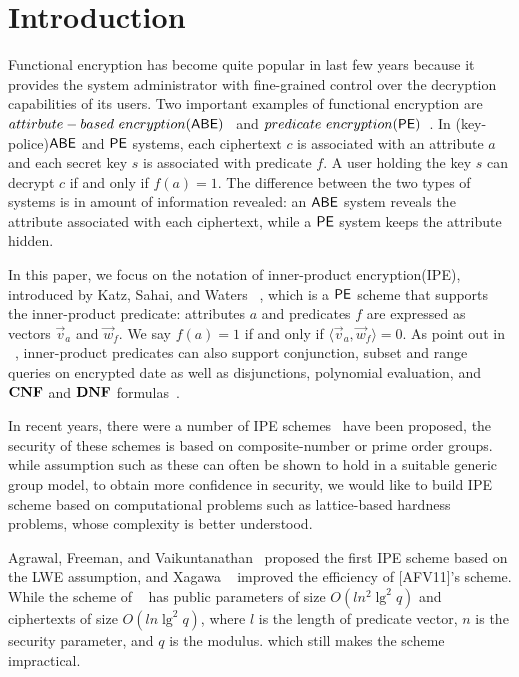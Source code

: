 \section{Introduction}
Functional encryption has become quite popular in last few years because it provides the system administrator with fine-grained control over the decryption capabilities of its users. Two important examples of functional encryption are $attirbute-based\ encryption(\ABE)$~\cite{EC:SahWat05, CCS:GPSW06} and $predicate\ encryption(\mathsf{PE})\\ $~\cite{TCC:BonWat07,
EC:KatSahWat08}. In (key-police)$\mathsf{ABE}$ and $\mathsf{PE}$ systems, each ciphertext $c$ is associated with an attribute $a$ and each secret key $s$ is associated with predicate $f$. A user holding the key $s$ can decrypt $c$ if and only if $f(a)=1$. The difference between the two types of systems is in amount of information revealed: an $\mathsf{ABE}$ system reveals the attribute associated with each ciphertext, while a $\mathsf{PE}$ system keeps the attribute hidden.\

In this paper, we focus on the notation of inner-product encryption(IPE), introduced by Katz, Sahai, and Waters ~\cite{EC:KatSahWat08}, which is a $\mathsf{PE}$ scheme that supports the inner-product predicate: attributes $a$ and predicates $f$ are expressed as vectors $\overrightarrow{v}_{a}$ and $\overrightarrow{w}_{f}$. We say $f(a)=1$ if and only if $\langle \overrightarrow{v}_{a}, \overrightarrow{w}_{f} \rangle=0$. As point out in  ~\cite{EC:KatSahWat08}, inner-product predicates can also support conjunction, subset and range queries on encrypted date\cite{TCC:BonWat07} as well as disjunctions, polynomial evaluation, and $\mathbf{CNF}$ and $\mathbf{DNF}$ formulas~\cite{EC:KatSahWat08}.\

In recent years, there were a number of IPE schemes~\cite{EC:KatSahWat08, AC:OkaTak09, EC:LOSTW10, C:OkaTak10, PKC:AttLib10, Park2011Inner, CANS:OkaTak11, EC:OkaTak12} have been proposed, the security of these schemes is based on composite-number or prime order groups. while assumption such as these can often be shown to hold in a suitable generic group model, to obtain more confidence in security, we would like to build IPE scheme based on computational problems such as lattice-based hardness problems, whose complexity is better understood.\

Agrawal, Freeman, and Vaikuntanathan~ \cite{AC:AgrFreVai11} proposed the first IPE scheme based on the LWE assumption, and Xagawa ~\cite{PKC:Xagawa13} improved the efficiency of [AFV11]'s scheme. While the scheme of ~\cite{PKC:Xagawa13} has public parameters of size $O(l n^{2}\lg^{2}q)$ and ciphertexts of size $O(l n\lg^{2}q)$, where $l$ is the length of predicate vector, $n$ is the security parameter, and $q$ is the modulus. which still makes the scheme impractical.

